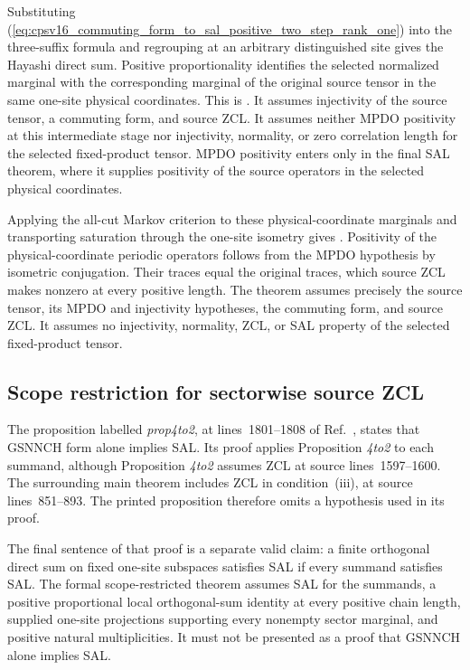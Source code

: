 \documentclass{article}
\begin{document}
Substituting
(\ref{eq:cpsv16_commuting_form_to_sal_positive_two_step_rank_one}) into the
three-suffix formula and regrouping at an arbitrary distinguished site gives
the Hayashi direct sum. Positive proportionality identifies the selected
normalized marginal with the corresponding marginal of the original source
tensor in the same one-site physical coordinates. This is
.
It assumes injectivity of the source tensor, a commuting form, and source
ZCL. It assumes neither MPDO positivity at this intermediate stage nor
injectivity, normality, or zero correlation length for the selected
fixed-product tensor. MPDO positivity enters only in the final SAL theorem,
where it supplies positivity of the source operators in the selected physical
coordinates.

Applying the all-cut Markov criterion to these physical-coordinate marginals
and transporting saturation through the one-site isometry gives
. Positivity of
the physical-coordinate periodic operators follows from the MPDO hypothesis
by isometric conjugation. Their traces equal the original traces, which source
ZCL makes nonzero at every positive length. The theorem assumes precisely the
source tensor, its MPDO and injectivity hypotheses, the commuting form,
and source ZCL. It assumes no injectivity, normality, ZCL, or SAL
property of the selected fixed-product tensor.

\subsection{Scope restriction for sectorwise source ZCL}

The proposition labelled \emph{prop4to2}, at lines~1801--1808 of
Ref.~\cite{Cirac2016MPDO_arXiv}, states that GSNNCH form alone implies SAL.
Its proof applies Proposition \emph{4to2} to each summand, although
Proposition \emph{4to2} assumes ZCL at source lines~1597--1600. The surrounding
main theorem includes ZCL in condition~(iii), at source lines~851--893. The
printed proposition therefore omits a hypothesis used in its proof.

The final sentence of that proof is a separate valid claim: a finite
orthogonal direct sum on fixed one-site subspaces satisfies SAL if every
summand satisfies SAL. The formal scope-restricted theorem assumes SAL for
the summands, a positive proportional local orthogonal-sum identity at every
positive chain length, supplied one-site projections supporting every
nonempty sector marginal, and positive natural multiplicities. It must not be
presented as a proof that GSNNCH alone implies SAL.
\end{document}
